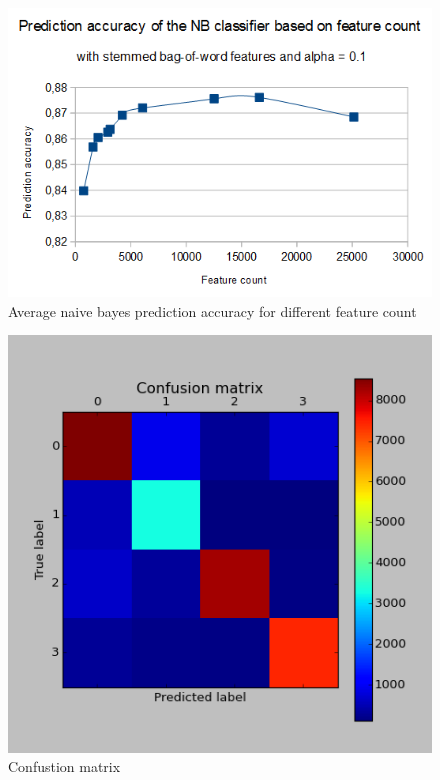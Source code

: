 \documentclass{acm_proc_article-sp}
\begin{document}
\begin{figure}
\includegraphics[width=1\columnwidth]{images/nb_feature_count.png}  
\caption{Average naive bayes prediction accuracy for different feature count} \label{fig:n3}
\end{figure}

\begin{figure}
\includegraphics[width=1\columnwidth]{images/conf_matrix.png}  
\caption{Confustion matrix} \label{fig:matrix}
\end{figure}
\end{document}
